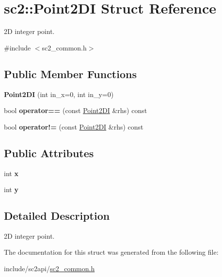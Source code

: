 \hypertarget{structsc2_1_1_point2_d_i}{}\section{sc2\+:\+:Point2\+DI Struct Reference}
\label{structsc2_1_1_point2_d_i}


2D integer point.  




{\ttfamily \#include $<$sc2\+\_\+common.\+h$>$}

\subsection*{Public Member Functions}
\begin{DoxyCompactItemize}
\item 
\mbox{\label{structsc2_1_1_point2_d_i_ab484691a214231940f68ba7d655bdc6b}} 
{\bfseries Point2\+DI} (int in\+\_\+x=0, int in\+\_\+y=0)
\item 
\mbox{\label{structsc2_1_1_point2_d_i_a664f59f779f668d88fe7a1b226cd3120}} 
bool {\bfseries operator==} (const \hyperlink{structsc2_1_1_point2_d_i}{Point2\+DI} \&rhs) const
\item 
\mbox{\label{structsc2_1_1_point2_d_i_a7c994fd9f99ad11da0056e377d355555}} 
bool {\bfseries operator!=} (const \hyperlink{structsc2_1_1_point2_d_i}{Point2\+DI} \&rhs) const
\end{DoxyCompactItemize}
\subsection*{Public Attributes}
\begin{DoxyCompactItemize}
\item 
\mbox{\label{structsc2_1_1_point2_d_i_a0e515ff099a006423fb65e3c8382efde}} 
int {\bfseries x}
\item 
\mbox{\label{structsc2_1_1_point2_d_i_a8fbb6f761a5c122c4f4d6d9c7664204d}} 
int {\bfseries y}
\end{DoxyCompactItemize}


\subsection{Detailed Description}
2D integer point. 

The documentation for this struct was generated from the following file\+:\begin{DoxyCompactItemize}
\item 
include/sc2api/\hyperlink{sc2__common_8h}{sc2\+\_\+common.\+h}\end{DoxyCompactItemize}
